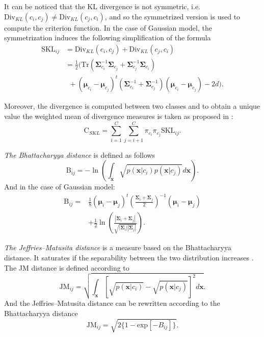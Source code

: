 \documentclass[journal,peerreview,onecolumn]{IEEEtran}
\begin{document}
            It can be noticed that the KL divergence is not symmetric, i.e. $\text{Div}_{KL}(c_i,c_j) \ne \text{Div}_{KL}(c_j,c_i)$, and so the symmetrized version is used to compute the criterion function. In the case of Gaussian model, the symmetrization induces the following simplification of the formula
            \begin{align}
                \text{SKL}_{ij} &=\text{Div}_{KL}(c_i,c_j) + \text{Div}_{KL}(c_j,c_i) \nonumber \\
                &= \frac{1}{2} \biggl( \text{Tr} (\boldsymbol{\Sigma}_{c_i}^{-1} \boldsymbol{\Sigma}_{c_j} + \boldsymbol{\Sigma}_{c_j}^{-1} \boldsymbol{\Sigma}_{c_i}) \nonumber \\
                &~~+ (\boldsymbol{\mu}_{c_i} - \boldsymbol{\mu}_{c_j})^t (\boldsymbol{\Sigma}_{c_i}^{-1} + \boldsymbol{\Sigma}_{c_j}^{-1}) (\boldsymbol{\mu}_{c_i} - \boldsymbol{\mu}_{c_j}) - 2d \biggr).
            \end{align}

            Moreover, the divergence is computed between two classes and to obtain a unique value the weighted mean of divergence measures is taken as proposed in \cite{bruzzone1995extension}:
            \begin{equation}
                \text{C}_{SKL} = \sum_{i=1}^{C} \sum_{j=i + 1}^{C} \pi_{c_i} \pi_{c_j} \text{SKL}_{ij}.
            \end{equation}

            \emph{The Bhattacharyya distance} is defined as follows
            \begin{equation}
                \text{B}_{ij} = - \ln \left( \int_\mathbf{x} \sqrt{p(\mathbf{x}|c_i) p(\mathbf{x}|c_j)} d\mathbf{x} \right).
            \end{equation}
            And in the case of Gaussian model:
            \begin{align}
                \text{B}_{ij} = &\frac{1}{8} (\boldsymbol{\mu}_i - \boldsymbol{\mu}_j)^t \left( \frac{\boldsymbol{\Sigma}_i + \boldsymbol{\Sigma}_j}{2} \right)^{-1} (\boldsymbol{\mu}_i - \boldsymbol{\mu}_j) \nonumber \\
                &+ \frac{1}{2} \ln \left( \frac{|\boldsymbol{\Sigma}_i + \boldsymbol{\Sigma}_j|}{\sqrt{|\boldsymbol{\Sigma}_i| |\boldsymbol{\Sigma}_j|}} \right).
            \end{align}

            \emph{The Jeffries–Matusita distance} is a measure based on the Bhattacharyya distance. It saturates if the separability between the two distribution increases \cite{bruzzone2009novel}. The JM distance is defined according to
            \begin{equation}
                \text{JM}_{ij} = \sqrt{ \int_\mathbf{x} \left[\sqrt{p(\mathbf{x}|c_i)} - \sqrt{p(\mathbf{x}|c_j)}\right]^2 d\mathbf{x} }.
            \end{equation}
            And the Jeffries–Matusita distance can be rewritten according to the Bhattacharyya distance
            \begin{equation}
                \text{JM}_{ij} = \sqrt{ 2 \{1 - \text{exp}[-B_{ij}]\} }.
            \end{equation}
\end{document}
